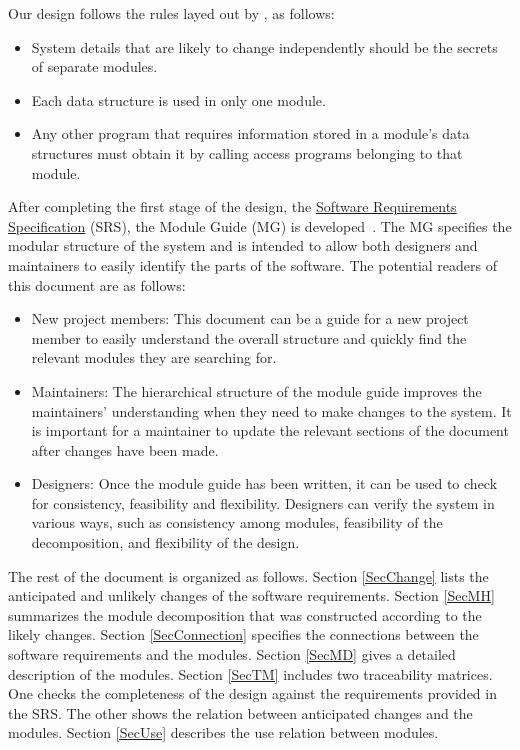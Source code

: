 \documentclass[12pt, titlepage]{article}
\begin{document}
Our design follows the rules layed out by \citet{ParnasEtAl1984}, as follows:
\begin{itemize}
\item System details that are likely to change independently should be the
  secrets of separate modules.
\item Each data structure is used in only one module.
\item Any other program that requires information stored in a module's data
  structures must obtain it by calling access programs belonging to that module.
\end{itemize}

After completing the first stage of the design, the 
\href{https://github.com/palmerst/cas741_sp/blob/master/Doc/SRS/SRS.pdf}{Software Requirements
Specification} (SRS), the Module Guide (MG) is developed~\citep{ParnasEtAl1984}. The MG
specifies the modular structure of the system and is intended to allow both
designers and maintainers to easily identify the parts of the software.  The
potential readers of this document are as follows:

\begin{itemize}
\item New project members: This document can be a guide for a new project member
  to easily understand the overall structure and quickly find the
  relevant modules they are searching for.
\item Maintainers: The hierarchical structure of the module guide improves the
  maintainers' understanding when they need to make changes to the system. It is
  important for a maintainer to update the relevant sections of the document
  after changes have been made.
\item Designers: Once the module guide has been written, it can be used to
  check for consistency, feasibility and flexibility. Designers can verify the
  system in various ways, such as consistency among modules, feasibility of the
  decomposition, and flexibility of the design.
\end{itemize}

The rest of the document is organized as follows. Section
\ref{SecChange} lists the anticipated and unlikely changes of the software
requirements. Section \ref{SecMH} summarizes the module decomposition that
was constructed according to the likely changes. Section \ref{SecConnection}
specifies the connections between the software requirements and the
modules. Section \ref{SecMD} gives a detailed description of the
modules. Section \ref{SecTM} includes two traceability matrices. One checks
the completeness of the design against the requirements provided in the SRS. The
other shows the relation between anticipated changes and the modules. Section
\ref{SecUse} describes the use relation between modules.
\end{document}
